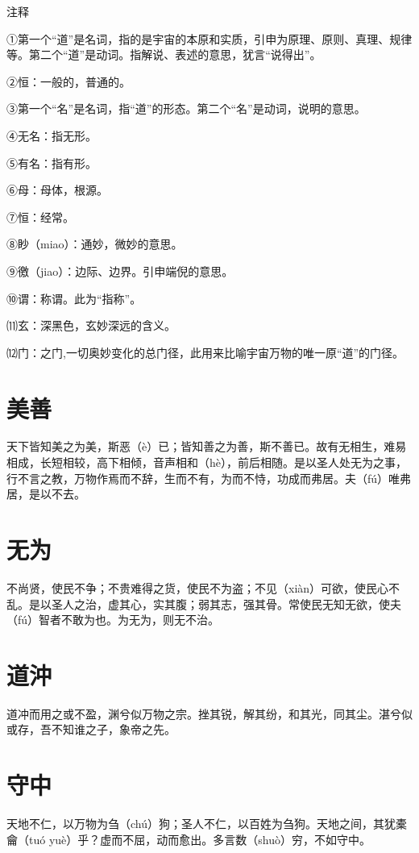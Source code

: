 \documentclass[a4paper,12pt,UTF8,twoside]{ctexbook}
\begin{document}
	注释
	
	①第一个“道”是名词，指的是宇宙的本原和实质，引申为原理、原则、真理、规律等。第二个“道”是动词。指解说、表述的意思，犹言“说得出”。
	
	②恒：一般的，普通的。
	
	③第一个“名”是名词，指“道”的形态。第二个“名”是动词，说明的意思。
	
	④无名：指无形。
	
	⑤有名：指有形。
	
	⑥母：母体，根源。
	
	⑦恒：经常。
	
	⑧眇（miao）：通妙，微妙的意思。
	
	⑨徼（jiao）：边际、边界。引申端倪的意思。
	
	⑩谓：称谓。此为“指称”。
	
	⑾玄：深黑色，玄妙深远的含义。
	
	⑿门：之门,一切奥妙变化的总门径，此用来比喻宇宙万物的唯一原“道”的门径。
	
	\chapter{美善}
	
	天下皆知美之为美，斯恶（è）已；皆知善之为善，斯不善已。故有无相生，难易相成，长短相较，高下相倾，音声相和（hè），前后相随。是以圣人处无为之事，行不言之教，万物作焉而不辞，生而不有，为而不恃，功成而弗居。夫（fú）唯弗居，是以不去。
	
	\chapter{无为}
	
	不尚贤，使民不争；不贵难得之货，使民不为盗；不见（xiàn）可欲，使民心不乱。是以圣人之治，虚其心，实其腹；弱其志，强其骨。常使民无知无欲，使夫（fú）智者不敢为也。为无为，则无不治。
	
	\chapter{道沖}
	道冲而用之或不盈，渊兮似万物之宗。挫其锐，解其纷，和其光，同其尘。湛兮似或存，吾不知谁之子，象帝之先。
	
	
	
	\chapter{守中}
	
	天地不仁，以万物为刍（chú）狗；圣人不仁，以百姓为刍狗。天地之间，其犹橐龠（tuó	yuè）乎？虚而不屈，动而愈出。多言数（shuò）穷，不如守中。
	
\end{document}
